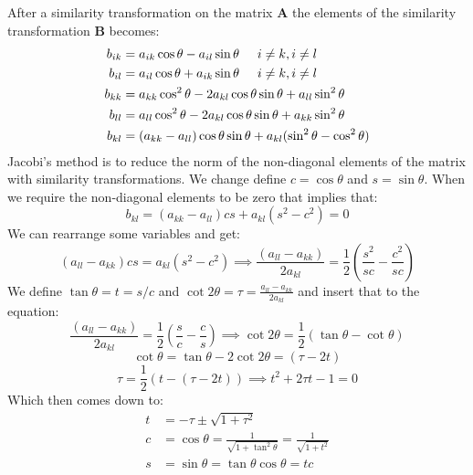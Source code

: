 After a similarity transformation on the matrix $\textbf{A}$ the elements of the similarity transformation $\textbf{B}$ becomes:
\begin{align*}
b_{ik} &= a_{ik} \cos \theta - a_{il} \sin \theta \hspace{0.5cm} i \neq k, i\neq l\\
b_{il} &= a_{il} \cos \theta + a_{ik} \sin \theta \hspace{0.5cm} i \neq k, i\neq l\\ 
b_{kk} &= a_{kk} \cos^2 \theta - 2a_{kl} \cos \theta \sin \theta + a_{ll} \sin^2 \theta \\
b_{ll} &= a_{ll} \cos^2 \theta - 2a_{kl} \cos \theta \sin \theta + a_{kk} \sin^2 \theta \\
b_{kl} &= (a_{kk} - a_{ll})\cos \theta \sin \theta + a_{kl} (\sin^2 \theta - \cos^2 \theta) \\
\end{align*}
Jacobi's method is to reduce the norm of the non-diagonal elements of the matrix with similarity transformations. We change define $c = \cos \theta$ and $s = \sin \theta$. When we require the non-diagonal elements to be zero that implies that:
\[
b_{kl} = (a_{kk} - a_{ll})cs + a_{kl} (s^2 - c^2) = 0
\]
We can rearrange some variables and get:
\[
(a_{ll}- a_{kk})cs = a_{kl} (s^2 - c^2) \implies \frac{(a_{ll} - a_{kk})}{2a_{kl}} = \frac{1}{2}\left(\frac{s^2}{sc} - \frac{c^2}{sc}\right)
\]
We define $\tan \theta = t = s/c$ and $\cot 2\theta = \tau = \frac{a_{ll} - a_{kk}}{2a_{kl}}$ and insert that to the equation:
\[
\frac{(a_{ll} - a_{kk})}{2a_{kl}} = \frac{1}{2}\left(\frac{s}{c} - \frac{c}{s}\right) \implies \cot 2\theta = \frac{1}{2}(\tan \theta - \cot \theta)
\]
\[
\cot \theta = \tan \theta - 2\cot 2\theta = (\tau - 2 t)
\]
\[
\tau = \frac{1}{2}(t- (\tau - 2t)) \implies t^2 + 2\tau t-1 = 0
\]
Which then comes down to:
\begin{align}
t &= -\tau \pm \sqrt{1+\tau^2} \label{eq: t} \\ 
c &= \cos \theta = \frac{1}{\sqrt{1+\tan^2\theta}} = \frac{1}{\sqrt{1+t^2}} \label{eq: c}\\
s &= \sin \theta = \tan \theta \cos \theta = t c \label{eq: s}\\
\end{align}
